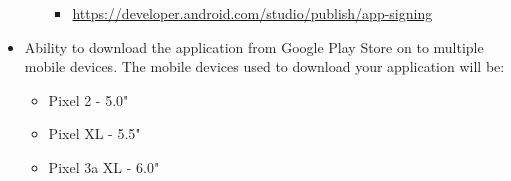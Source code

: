 \documentclass{article}
\begin{document}
\begin{itemize}
\begin{itemize}
\begin{itemize}
            \item \footnotesize\href{https://developer.android.com/studio/publish/app-signing}{https://developer.android.com/studio/publish/app-signing}
        \end{itemize}
    \end{itemize}
    \item Ability to download the application from Google Play Store on to multiple mobile devices. The mobile devices used to download your application will be:
    \begin{itemize}
        \item Pixel 2 - 5.0"
        \item Pixel XL - 5.5"
        \item Pixel 3a XL - 6.0"
    \end{itemize} 
\end{itemize}
\end{document}
